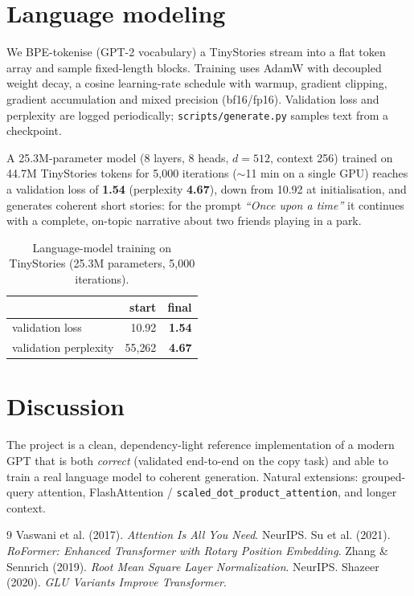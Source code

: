 \documentclass[11pt,a4paper]{article}
\begin{document}
\section{Language modeling}
We BPE-tokenise (GPT-2 vocabulary) a TinyStories stream into a flat token array and
sample fixed-length blocks. Training uses AdamW with decoupled weight decay, a cosine
learning-rate schedule with warmup, gradient clipping, gradient accumulation and mixed
precision (bf16/fp16). Validation loss and perplexity are logged periodically;
\texttt{scripts/generate.py} samples text from a checkpoint.

A 25.3M-parameter model (8 layers, 8 heads, $d{=}512$, context 256) trained on 44.7M
TinyStories tokens for 5{,}000 iterations ($\sim$11 min on a single GPU) reaches a
validation loss of \textbf{1.54} (perplexity \textbf{4.67}), down from 10.92 at
initialisation, and generates coherent short stories: for the prompt
\emph{``Once upon a time''} it continues with a complete, on-topic narrative about two
friends playing in a park.

\begin{table}[h]\centering
\begin{tabular}{lrr}\toprule
 & start & final \\ \midrule
validation loss & 10.92 & \textbf{1.54} \\
validation perplexity & 55{,}262 & \textbf{4.67} \\
\bottomrule\end{tabular}
\caption{Language-model training on TinyStories (25.3M parameters, 5{,}000 iterations).}
\end{table}

\section{Discussion}
The project is a clean, dependency-light reference implementation of a modern GPT that
is both \emph{correct} (validated end-to-end on the copy task) and able to train a real
language model to coherent generation. Natural extensions: grouped-query attention,
FlashAttention / \texttt{scaled\_dot\_product\_attention}, and longer context.

\begin{thebibliography}{9}
 Vaswani et al. (2017). \emph{Attention Is All You Need}. NeurIPS.
 Su et al. (2021). \emph{RoFormer: Enhanced Transformer with Rotary Position Embedding}.
 Zhang \& Sennrich (2019). \emph{Root Mean Square Layer Normalization}. NeurIPS.
 Shazeer (2020). \emph{GLU Variants Improve Transformer}.
\end{thebibliography}
\end{document}

